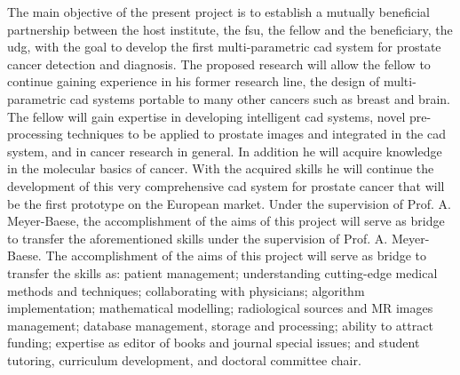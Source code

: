 The main objective of the present project is to establish a mutually beneficial partnership between the host institute, the \ac{fsu}, the fellow and the beneficiary, the \ac{udg}, with the goal to develop the first multi-parametric \ac{cad} system for prostate cancer detection and diagnosis.
The proposed research will allow the fellow to continue gaining experience in his former research line, the design of multi-parametric \ac{cad} systems portable to many other cancers such as breast and brain.
The fellow will gain expertise in developing intelligent \ac{cad} systems, novel pre-processing techniques to be applied to prostate images and integrated in the \ac{cad} system, and in cancer research in general.
In addition he will acquire knowledge in the molecular basics of cancer.
With the acquired skills he will continue the development of this very comprehensive \ac{cad} system for prostate cancer that will be the first prototype on the European market.
Under the supervision of Prof. A. Meyer-Baese, the accomplishment of the aims of this project will serve as bridge to transfer the aforementioned skills under the supervision of Prof. A. Meyer-Baese.
The accomplishment of the aims of this project will serve as bridge to transfer the skills as: patient management; understanding cutting-edge medical methods and techniques; collaborating with physicians; algorithm implementation; mathematical modelling; radiological sources and MR images management; database management, storage and processing; ability to attract funding; expertise as editor of books and journal special issues; and student tutoring, curriculum development, and doctoral committee chair.

